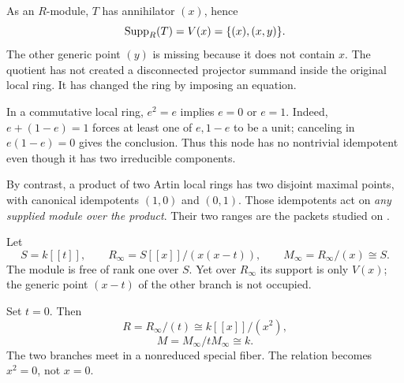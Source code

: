 As an $R$-module, $T$ has annihilator $(x)$, hence
\[
\operatorname{Supp}_R(T)=V(x)=\{(x),(x,y)\}.
\]
The other generic point $(y)$ is missing because it does not contain $x$. The quotient has not created a disconnected projector summand inside the original local ring. It has changed the ring by imposing an equation.

In a commutative local ring, $e^2=e$ implies $e=0$ or $e=1$. Indeed, $e+(1-e)=1$ forces at least one of $e,1-e$ to be a unit; canceling in $e(1-e)=0$ gives the conclusion. Thus this node has no nontrivial idempotent even though it has two irreducible components.

By contrast, a product of two Artin local rings has two disjoint maximal points, with canonical idempotents $(1,0)$ and $(0,1)$. Those idempotents act on \emph{any supplied module over the product}. Their two ranges are the packets studied on .


Let
\[
S=k[[t]],\qquad R_\infty=S[[x]]/(x(x-t)),\qquad
M_\infty=R_\infty/(x)\cong S.
\]
The module is free of rank one over $S$. Yet over $R_\infty$ its support is only $V(x)$; the generic point $(x-t)$ of the other branch is not occupied.

\begin{minipage}[c]{.47\linewidth}
\end{minipage}\hfill
\begin{minipage}[c]{.49\linewidth}
Set $t=0$. Then
\[
R=R_\infty/(t)\cong k[[x]]/(x^2),
\]
\[
M=M_\infty/tM_\infty\cong k.
\]
The two branches meet in a nonreduced special fiber. The relation becomes $x^2=0$, not $x=0$.
\end{minipage}

